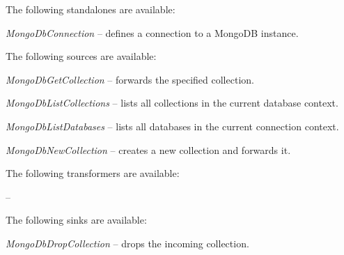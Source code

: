 \documentclass[a4paper]{book}
\begin{document}
The following standalones are available:
\begin{tight_itemize}
  \item \textit{MongoDbConnection} -- defines a connection to a MongoDB instance.
\end{tight_itemize}

The following sources are available:
\begin{tight_itemize}
  \item \textit{MongoDbGetCollection} -- forwards the specified collection.
  \item \textit{MongoDbListCollections} -- lists all collections in the current
  database context.
  \item \textit{MongoDbListDatabases} -- lists all databases in the current
  connection context.
  \item \textit{MongoDbNewCollection} -- creates a new collection and forwards it.
\end{tight_itemize}

The following transformers are available:
\begin{tight_itemize}
  \item \textit{} --
\end{tight_itemize}

The following sinks are available:
\begin{tight_itemize}
  \item \textit{MongoDbDropCollection} -- drops the incoming collection.
\end{tight_itemize}



\end{document}
